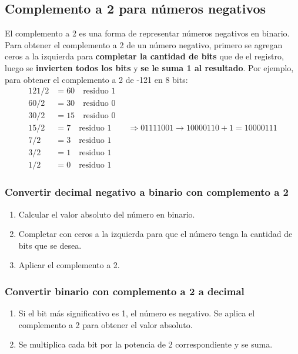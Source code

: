 \subsection{Complemento a 2 para números negativos}
El complemento a 2 es una forma de representar números negativos en binario. Para obtener el complemento a 2 de un número negativo, primero se agregan ceros a la izquierda para \textbf{completar la cantidad de bits} que de el registro, luego se \textbf{invierten todos los bits} y \textbf{se le suma 1 al resultado}.
Por ejemplo, para obtener el complemento a 2 de -121 en 8 bits:
\begin{align*}
    121/2 &= 60 \quad \text{residuo } 1\\
    60/2 &= 30 \quad \text{residuo } 0\\
    30/2 &= 15 \quad \text{residuo } 0\\
    15/2 &= 7 \quad \text{residuo } 1 \quad \quad \Rightarrow 01111001 \rightarrow 10000110 + 1 = 10000111 \\
    7/2 &= 3 \quad \text{residuo } 1\\
    3/2 &= 1 \quad \text{residuo } 1\\
    1/2 &= 0 \quad \text{residuo } 1
\end{align*}

\subsubsection{Convertir decimal negativo a binario con complemento a 2}
\begin{enumerate}
    \item Calcular el valor absoluto del número en binario.
    \item Completar con ceros a la izquierda para que el número tenga la cantidad de bits que se desea.
    \item Aplicar el complemento a 2.
\end{enumerate}

\subsubsection{Convertir binario con complemento a 2 a decimal}
\begin{enumerate}
    \item Si el bit más significativo es 1, el número es negativo. Se aplica el complemento a 2 para obtener el valor absoluto.
    \item Se multiplica cada bit por la potencia de 2 correspondiente y se suma.
\end{enumerate}

